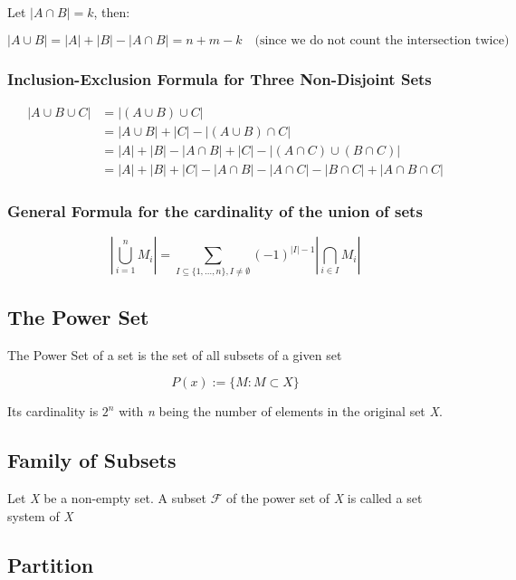 Let \( |A \cap B| = k \), then:

\[
	|A \cup B| = |A| + |B| - |A \cap B| = n + m - k \quad \text{(since we do not count the intersection 
	twice)}
\]

\subsubsection{Inclusion-Exclusion Formula for Three Non-Disjoint Sets}

\begin{align*}
	|A \cup B \cup C| &= |(A \cup B) \cup C| \\ 
	&= |A \cup B| + |C| - |(A \cup B) \cap C| \\
 	&= |A| + |B| - |A \cap B| + |C| - |(A \cap C) \cup (B \cap C)|\\
	&= |A| + |B| + |C| - |A \cap B| - |A \cap C| - |B \cap C| + |A \cap B \cap C|
\end{align*}

\subsubsection{General Formula for the cardinality of the union of sets}

\[
	\left\vert \bigcup_{i = 1}^n M_i \right\vert  = \sum_{I \subseteq \{1, \dots, n\}, I \neq \emptyset}
	{(-1)}^{|I| - 1} \left\vert \bigcap_{i \in I} M_i \right\vert
\]

\subsection{The Power Set}

The Power Set of a set is the set of all subsets of a given set 

\[
	P(x):= \{ M: M \subset X\}
\]

Its cardinality is \(2^n\) with \emph{n} being the number of elements in the original set \emph{X}.

\subsection{Family of Subsets}

Let \emph{X} be a non-empty set. A subset \(\mathscr{F}\) of the power set of \emph{X} is called a 
set system of \emph{X}

\subsection{Partition}


